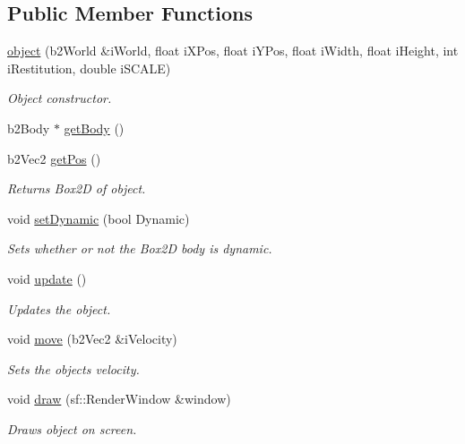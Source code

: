 \subsection*{Public Member Functions}
\begin{DoxyCompactItemize}
\item 
\hyperlink{classobject_a6444f1addfcba46e8a38e3a10afc5b55}{object} (b2\+World \&i\+World, float i\+X\+Pos, float i\+Y\+Pos, float i\+Width, float i\+Height, int i\+Restitution, double i\+S\+C\+A\+LE)
\begin{DoxyCompactList}\small\item\em Object constructor. \end{DoxyCompactList}\item 
b2\+Body $\ast$ \hyperlink{classobject_ae2e614e0e6af97805323193da7a1e7ff}{get\+Body} ()
\item 
b2\+Vec2 \hyperlink{classobject_a505665c0df5c44d5dfc77881fe5d95a4}{get\+Pos} ()
\begin{DoxyCompactList}\small\item\em Returns Box2D of object. \end{DoxyCompactList}\item 
void \hyperlink{classobject_a872e3c1ff75e786a58389852aad28a65}{set\+Dynamic} (bool Dynamic)
\begin{DoxyCompactList}\small\item\em Sets whether or not the Box2D body is dynamic. \end{DoxyCompactList}\item 
void \hyperlink{classobject_a7fdffa65c5bb1322d322d7e7056fa31f}{update} ()
\begin{DoxyCompactList}\small\item\em Updates the object. \end{DoxyCompactList}\item 
void \hyperlink{classobject_a74da589c4536cacfd76fa230a4dbee9e}{move} (b2\+Vec2 \&i\+Velocity)
\begin{DoxyCompactList}\small\item\em Sets the object\textquotesingle{}s velocity. \end{DoxyCompactList}\item 
void \hyperlink{classobject_a844b4128957b29e24370efe2d2cb3dca}{draw} (sf\+::\+Render\+Window \&window)
\begin{DoxyCompactList}\small\item\em Draws object on screen. \end{DoxyCompactList}\end{DoxyCompactItemize}


